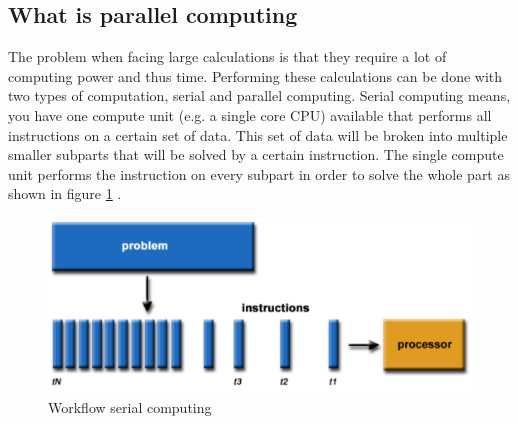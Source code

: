 \documentclass[a4paper, 11pt]{report}
\begin{document}
	\subsection{What is parallel computing}
The problem when facing large calculations is that they require a lot of computing power and thus time. Performing these calculations can be done with two types of computation, serial and parallel computing. Serial computing means, you have one compute unit (e.g. a single core CPU) available that performs all instructions on a certain set of data. This set of data will be broken into multiple smaller subparts that will be solved by a certain instruction. The single compute unit performs the instruction on every subpart in order to solve the whole part as shown in figure \ref{fig:SerialC} \cite{barney2012parallel}.
	\begin{figure}[ht]
		\centering
		\includegraphics[scale=.4]{images/serialProblem.pdf}
		\caption{Workflow serial computing}
		\label{fig:SerialC}
	\end{figure}
\end{document}
